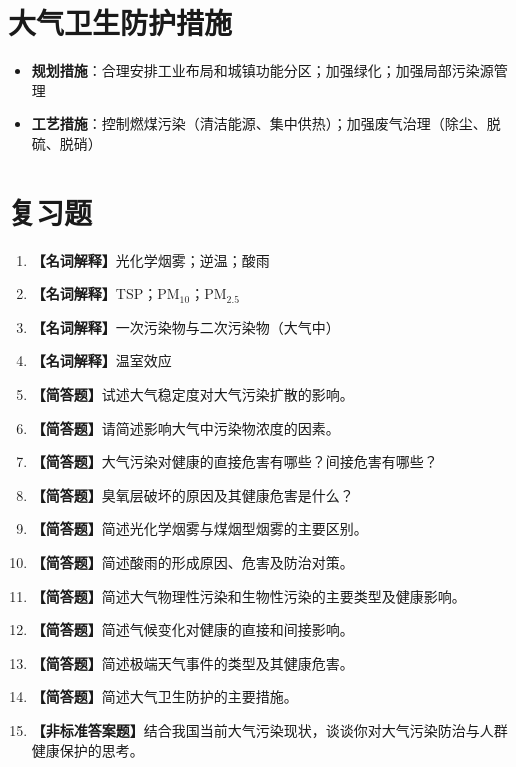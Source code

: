 \documentclass[10pt,a4paper,oneside]{ctexbook}
\begin{document}
\section{大气卫生防护措施}

\begin{itemize}[leftmargin=*]
    \item \textbf{规划措施}：合理安排工业布局和城镇功能分区；加强绿化；加强局部污染源管理
    \item \textbf{工艺措施}：控制燃煤污染（清洁能源、集中供热）；加强废气治理（除尘、脱硫、脱硝）
\end{itemize}

\section{复习题}

\begin{enumerate}[leftmargin=*, itemsep=8pt]
    \item \textbf{【名词解释】}光化学烟雾；逆温；酸雨
    \item \textbf{【名词解释】}TSP；PM$_{10}$；PM$_{2.5}$
    \item \textbf{【名词解释】}一次污染物与二次污染物（大气中）
    \item \textbf{【名词解释】}温室效应
    \item \textbf{【简答题】}试述大气稳定度对大气污染扩散的影响。
    \item \textbf{【简答题】}请简述影响大气中污染物浓度的因素。
    \item \textbf{【简答题】}大气污染对健康的直接危害有哪些？间接危害有哪些？
    \item \textbf{【简答题】}臭氧层破坏的原因及其健康危害是什么？
    \item \textbf{【简答题】}简述光化学烟雾与煤烟型烟雾的主要区别。
    \item \textbf{【简答题】}简述酸雨的形成原因、危害及防治对策。
    \item \textbf{【简答题】}简述大气物理性污染和生物性污染的主要类型及健康影响。
    \item \textbf{【简答题】}简述气候变化对健康的直接和间接影响。
    \item \textbf{【简答题】}简述极端天气事件的类型及其健康危害。
    \item \textbf{【简答题】}简述大气卫生防护的主要措施。
    \item \textbf{【非标准答案题】}结合我国当前大气污染现状，谈谈你对大气污染防治与人群健康保护的思考。
\end{enumerate}
\end{document}
